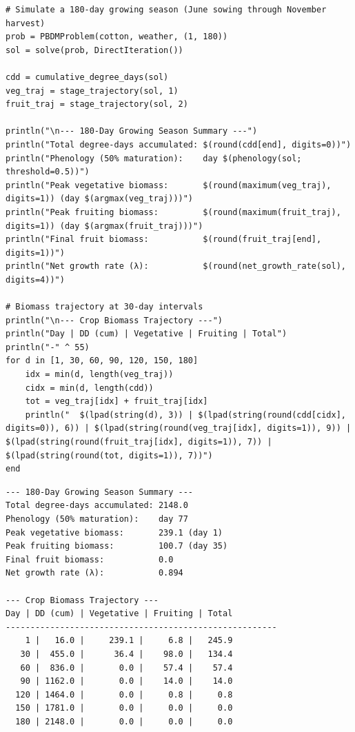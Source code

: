 \begin{verbatim}
# Simulate a 180-day growing season (June sowing through November harvest)
prob = PBDMProblem(cotton, weather, (1, 180))
sol = solve(prob, DirectIteration())

cdd = cumulative_degree_days(sol)
veg_traj = stage_trajectory(sol, 1)
fruit_traj = stage_trajectory(sol, 2)

println("\n--- 180-Day Growing Season Summary ---")
println("Total degree-days accumulated: $(round(cdd[end], digits=0))")
println("Phenology (50% maturation):    day $(phenology(sol; threshold=0.5))")
println("Peak vegetative biomass:       $(round(maximum(veg_traj), digits=1)) (day $(argmax(veg_traj)))")
println("Peak fruiting biomass:         $(round(maximum(fruit_traj), digits=1)) (day $(argmax(fruit_traj)))")
println("Final fruit biomass:           $(round(fruit_traj[end], digits=1))")
println("Net growth rate (λ):           $(round(net_growth_rate(sol), digits=4))")

# Biomass trajectory at 30-day intervals
println("\n--- Crop Biomass Trajectory ---")
println("Day | DD (cum) | Vegetative | Fruiting | Total")
println("-" ^ 55)
for d in [1, 30, 60, 90, 120, 150, 180]
    idx = min(d, length(veg_traj))
    cidx = min(d, length(cdd))
    tot = veg_traj[idx] + fruit_traj[idx]
    println("  $(lpad(string(d), 3)) | $(lpad(string(round(cdd[cidx], digits=0)), 6)) | $(lpad(string(round(veg_traj[idx], digits=1)), 9)) | $(lpad(string(round(fruit_traj[idx], digits=1)), 7)) | $(lpad(string(round(tot, digits=1)), 7))")
end
\end{verbatim}




\begin{verbatim}
--- 180-Day Growing Season Summary ---
Total degree-days accumulated: 2148.0
Phenology (50% maturation):    day 77
Peak vegetative biomass:       239.1 (day 1)
Peak fruiting biomass:         100.7 (day 35)
Final fruit biomass:           0.0
Net growth rate (λ):           0.894

--- Crop Biomass Trajectory ---
Day | DD (cum) | Vegetative | Fruiting | Total
-------------------------------------------------------
    1 |   16.0 |     239.1 |     6.8 |   245.9
   30 |  455.0 |      36.4 |    98.0 |   134.4
   60 |  836.0 |       0.0 |    57.4 |    57.4
   90 | 1162.0 |       0.0 |    14.0 |    14.0
  120 | 1464.0 |       0.0 |     0.8 |     0.8
  150 | 1781.0 |       0.0 |     0.0 |     0.0
  180 | 2148.0 |       0.0 |     0.0 |     0.0
\end{verbatim}



